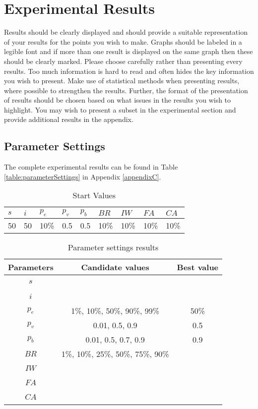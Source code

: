 \section{Experimental Results}

Results should be clearly displayed and should provide a suitable representation of your results for the points you wish to make. Graphs should be labeled in a legible font and if more than one result is displayed on the same graph then these should be clearly marked.   Please choose carefully rather than presenting every results. Too much information is hard to read and often hides the key information you wish to present. Make use of statistical methods when presenting results, where possible to strengthen the results.  Further, the format of the presentation of results should be chosen based on what issues in the results you wish to highlight. You may wish to present a subset in the experimental section and provide additional results in the appendix.

\subsection{Parameter Settings}
\label{subsec:parameterSettings_results}

The complete experimental results can be found in Table \ref{table:parameterSettings} in Appendix \ref{appendixC}.

\begin{table}[H]
	\centering
    \begin{tabular}{|l|l|l|l|l|l|l|l|l|}
 	\hline
 	$s$ & $i$ & $p_{e}$ & $p_{v}$ & $p_{b}$ & $BR$  & $IW$ & $FA$ & $CA$  \\
 	\hline
    50 & 50 & 10\% & 0.5 & 0.5 & 10\% & 10\% & 10\%  & 10\%  \\
	\hline
    \end{tabular}
    \caption {Start Values}
    \label{table:parameter_startvalues}
	\end{table}

	\begin{table}[H]
	\centering
    \begin{tabular}{|c|c||c|}
 	\hline
 	Parameters & Candidate values & Best value\\
 	\hline
    $s$ & ~ & ~ \\
    $i$ & ~ & ~ \\
    $p_{e}$ & 1\%, 10\%, 50\%, 90\%, 99\% & 50\% \\
    $p_{v}$ & 0.01, 0.5, 0.9 & 0.5 \\
    $p_{b}$ & 0.01, 0.5, 0.7, 0.9 & 0.9 \\
    $BR$ & 1\%, 10\%, 25\%, 50\%, 75\%, 90\% & ~ \\
    $IW$ & ~ & ~ \\
    $FA$ & ~ & ~ \\
    $CA$ & ~ & ~ \\
	\hline
    \end{tabular}
    \caption {Parameter settings results}
    \label{table:parameterSettings2}
	\end{table}

